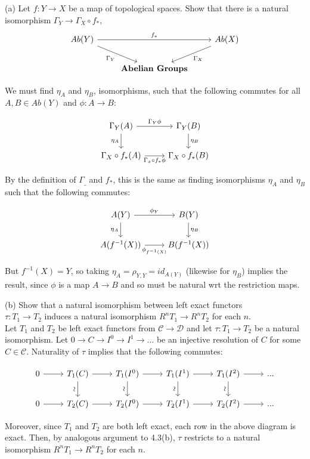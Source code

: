 (a) Let $f: Y \rightarrow X$ be a map of topological spaces. Show that there is a natural isomorphism $\Gamma_Y \rightarrow \Gamma_X \circ f_*$, 
\[
\begin{tikzcd}
Ab(Y) \arrow[rr,"f_*"] \arrow[rd, "\Gamma_Y"'] & & Ab(X) \arrow[ld, "\Gamma_X"]\\
& \textbf{Abelian Groups} 
\end{tikzcd}
\]

We must find $\eta_A$ and $\eta_B$,  isomorphisms, such that the following commutes for all $A,B \in Ab(Y)$ and $\phi:A \rightarrow B$: 

\[
\begin{tikzcd}
\Gamma_Y(A) \arrow[r, "\Gamma_Y \phi"] \arrow[d, "\eta_A"']
&  \Gamma_Y(B) \arrow[d, "\eta_B"] \\
\Gamma_X  \circ f_*(A) \arrow[r, "\Gamma_x \circ f_* \phi"']
& \Gamma_X  \circ f_*(B)
\end{tikzcd}
\]

By the definition of $\Gamma_{\_}$ and $f_*$, this is the same as finding isomorphisms $\eta_A$ and $\eta_B$ such that the following commutes:

\[
\begin{tikzcd}
A(Y) \arrow[r, "\phi_Y"] \arrow[d, "\eta_A"']
&  B(Y) \arrow[d, "\eta_B"] \\
A(f^{-1}(X)) \arrow[r, "\phi_{f^{-1}(X)}"']
& B(f^{-1}(X))
\end{tikzcd}
\]

But $f^{-1}(X) = Y$, so taking $\eta_A = \rho_{Y, Y} = id_{A(Y)}$ (likewise for $\eta_B$) implies the result, since $\phi$ is a map $A \rightarrow B$ and so must be natural wrt the restriction maps.

 (b) Show that a natural isomorphism between left exact functors \\
$\tau: T_1 \rightarrow  T_2$ induces a natural isomorphism $R^nT_1 \rightarrow R^nT_2$ for each $n$.\\

Let $T_1$ and $T_2$ be left exact functors from $\mathcal{C} \rightarrow \mathcal{D}$ and let $\tau: T_1 \rightarrow T_2$ be a natural isomorphism. Let $0 \rightarrow C \rightarrow I^0 \rightarrow I^1 \rightarrow ...$ be an injective resolution of $C$ for some $C \in \mathcal{C}$. Naturality of $\tau$ implies that the following commutes:

\[
\begin{tikzcd}
0 \arrow[r] 
& T_1(C) \arrow[r] \arrow[d, "\rotatebox{90}{\(\sim\)}"']
& T_1(I^0) \arrow[r] \arrow[d, "\rotatebox{90}{\(\sim\)}"']
& T_1(I^1) \arrow[r] \arrow[d, "\rotatebox{90}{\(\sim\)}"']
& T_1(I^2) \arrow[r] \arrow[d, "\rotatebox{90}{\(\sim\)}"']
& ...
\\
0 \arrow[r]
& T_2(C) \arrow[r]
& T_2(I^0) \arrow[r]
& T_2(I^1) \arrow[r]
& T_2(I^2) \arrow[r]
& ...
\end{tikzcd}
\]

Moreover, since $T_1$ and $T_2$ are both left exact, each row in the above diagram is exact. Then, by analogous argument to 4.3(b), $\tau$ restricts to a natural isomorphism $R^nT_1 \rightarrow R^nT_2$ for each $n$.

